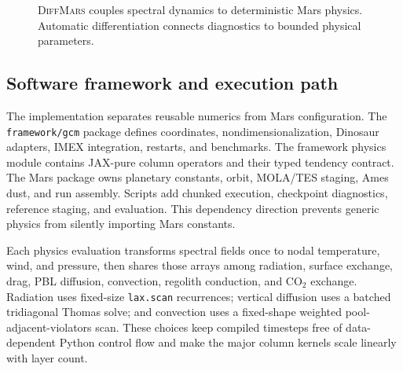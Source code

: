 \documentclass{article}
\newcommand{\model}{\textsc{DiffMars}}
\begin{document}
\begin{figure}[t]
\centering
{}
\caption{\model{} couples spectral dynamics to deterministic Mars physics.
Automatic differentiation connects diagnostics to bounded physical parameters.}
\label{fig:architecture}
\end{figure}

\subsection{Software framework and execution path}
The implementation separates reusable numerics from Mars configuration. The
\texttt{framework/gcm} package defines coordinates, nondimensionalization,
Dinosaur adapters, IMEX integration, restarts, and benchmarks. The framework
physics module contains JAX-pure column operators and their typed tendency
contract. The Mars package owns
planetary constants, orbit, MOLA/TES staging, Ames dust, and run assembly.
Scripts add chunked execution, checkpoint diagnostics, reference staging, and
evaluation. This dependency direction prevents generic physics from silently
importing Mars constants.

Each physics evaluation transforms spectral fields once to nodal temperature,
wind, and pressure, then shares those arrays among radiation, surface exchange,
drag, PBL diffusion, convection, regolith conduction, and \(\mathrm{CO_2}\)
exchange. Radiation uses fixed-size \texttt{lax.scan} recurrences; vertical
diffusion uses a batched tridiagonal Thomas solve; and convection uses a
fixed-shape weighted pool-adjacent-violators scan. These choices keep compiled
timesteps free of data-dependent Python control flow and make the major column
kernels scale linearly with layer count.
\end{document}
